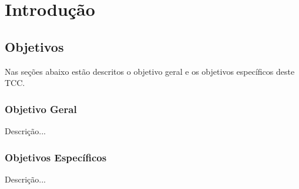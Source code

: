 \chapter{Introdução}




\section{Objetivos}


Nas seções abaixo estão descritos o objetivo geral e os objetivos específicos deste TCC.


\subsection{Objetivo Geral}


Descrição...


\subsection{Objetivos Específicos}


Descrição...